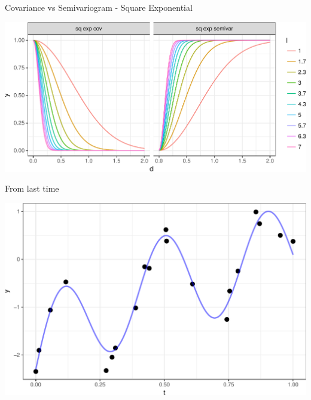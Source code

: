 \documentclass[11pt,ignorenonframetext,]{beamer}
\begin{document}
\begin{frame}{%
\protect\hypertarget{covariance-vs-semivariogram---square-exponential}{%
Covariance vs Semivariogram - Square Exponential}}

\begin{center}\includegraphics[width=\textwidth]{Lec13_files/figure-beamer/unnamed-chunk-3-1} \end{center}

\end{frame}

\begin{frame}{%
\protect\hypertarget{from-last-time}{%
From last time}}

\begin{center}\includegraphics[width=\textwidth]{Lec13_files/figure-beamer/unnamed-chunk-4-1} \end{center}

\end{frame}
\end{document}
